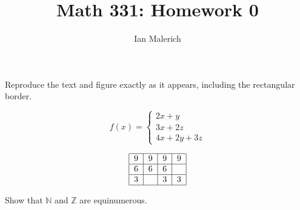 \documentclass[12pt]{jhwhw}
\author{Ian Malerich}
\title{Math 331: Homework 0}
\begin{document}
\raggedright{}

\problem{}

	Reproduce the text and figure exactly as it appears, including the rectangular border.

\solution

	$$ 
		f(x) = 
		\begin{cases}
			2x + y \\
			3x + 2z \\
			4x + 2y + 3z
		\end{cases} 
	$$

	$$
		\begin{tabular}{|c|c|c|c|}
			\hline
			9 & 9 & 9 & 9 \\
			\hline
			6 & 6 & 6 & \\
			\hline
			3 &   & 3 & 3 \\
			\hline
		\end{tabular}
	$$

\problem{}

	Show that $\mathbb{N}$ and $\mathbb{Z}$ are equinumerous.
\end{document}
